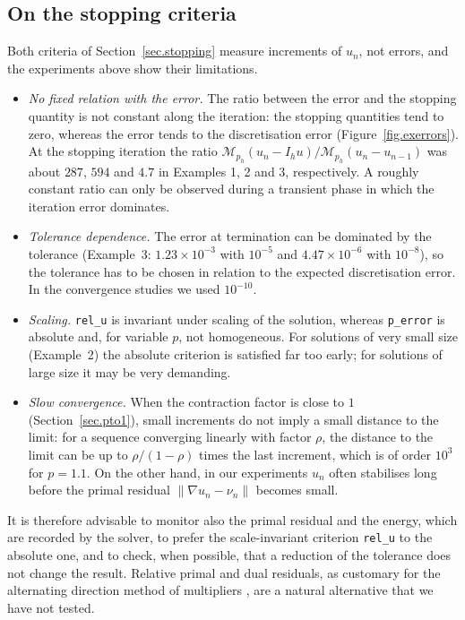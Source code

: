 \documentclass[11pt]{amsart}
\theoremstyle{definition}
\theoremstyle{remark}
\numberwithin{equation}{section}
\begin{document}
\subsection{On the stopping criteria}\label{sec.stopping.discussion}
Both criteria of Section~\ref{sec.stopping} measure increments of $u_n$, not errors, and the experiments above show their limitations.
\begin{itemize}
\item \emph{No fixed relation with the error.} The ratio between the error and the stopping quantity is not constant along the iteration: the stopping quantities tend to zero, whereas the error tends to the discretisation error (Figure~\ref{fig.exerrors}). At the stopping iteration the ratio $\mathcal M_{p_h}(u_n-I_hu)/\mathcal M_{p_h}(u_n-u_{n-1})$ was about $287$, $594$ and $4.7$ in Examples 1, 2 and 3, respectively. A roughly constant ratio can only be observed during a transient phase in which the iteration error dominates.
\item \emph{Tolerance dependence.} The error at termination can be dominated by the tolerance (Example~3: $1.23\times10^{-3}$ with $10^{-5}$ and $4.47\times10^{-6}$ with $10^{-8}$), so the tolerance has to be chosen in relation to the expected discretisation error. In the convergence studies we used $10^{-10}$.
\item \emph{Scaling.} \texttt{rel\_u} is invariant under scaling of the solution, whereas \texttt{p\_error} is absolute and, for variable $p$, not homogeneous. For solutions of very small size (Example~2) the absolute criterion is satisfied far too early; for solutions of large size it may be very demanding.
\item \emph{Slow convergence.} When the contraction factor is close to $1$ (Section~\ref{sec.pto1}), small increments do not imply a small distance to the limit: for a sequence converging linearly with factor $\rho$, the distance to the limit can be up to $\rho/(1-\rho)$ times the last increment, which is of order $10^3$ for $p=1.1$. On the other hand, in our experiments $u_n$ often stabilises long before the primal residual $\|\nabla u_n-\nu_n\|$ becomes small.
\end{itemize}
It is therefore advisable to monitor also the primal residual and the energy, which are recorded by the solver, to prefer the scale-invariant criterion \texttt{rel\_u} to the absolute one, and to check, when possible, that a reduction of the tolerance does not change the result. Relative primal and dual residuals, as customary for the alternating direction method of multipliers \cite{Boyd}, are a natural alternative that we have not tested.
\end{document}
